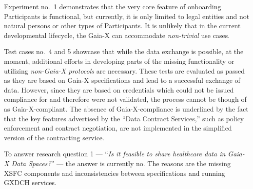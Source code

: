 Experiment no.~1 demonstrates that the very core feature of onboarding Participants is functional, but currently, it is only limited to legal entities and not natural persons or other types of Participants.
It is unlikely that in the current developmental lifecycle, the Gaia-X can accommodate \textit{non-trivial} use cases.

Test cases no.~4 and 5 showcase that while the data exchange is possible, at the moment, additional efforts in developing parts of the missing functionality or utilizing \textit{non-Gaia-X protocols} are necessary.
These tests are evaluated as passed as they are based on Gaia-X specifications and lead to a successful exchange of data.
However, since they are based on credentials which could not be issued compliance for and therefore were not validated, the process cannot be though of as Gaia-X-compliant.
The absence of Gaia-X-compliance is underlined by the fact that the key features advertised by the ``Data Contract Services,'' such as policy enforcement and contract negotiation, are not implemented in the simplified version of the contracting service.

To answer research question 1 --- ``\textit{Is it feasible to share healthcare data in Gaia-X Data Spaces?}'' --- the answer is currently no.
The reasons are the missing XSFC components and inconsistencies between specifications and running GXDCH services.
